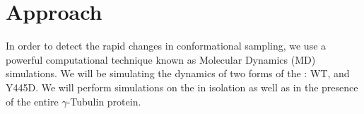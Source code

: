  \section{Approach}
 
In order to detect the rapid changes in conformational sampling, we use a powerful computational technique known as Molecular Dynamics (MD) simulations. We will be simulating the dynamics of two forms of the \gct{}: WT, and Y445D. We will perform simulations on the \gct in isolation as well as in the presence of the entire $\gamma$-Tubulin protein. 

 
 
 
 
 